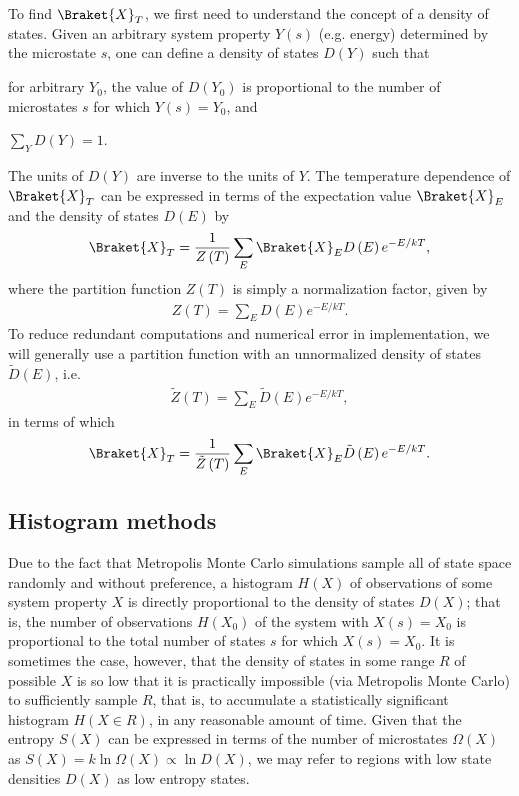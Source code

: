 \documentclass[11pt]{article}
\newcommand{\bk}{\Braket} %
\newcommand{\f}[2]{\dfrac{#1}{#2}} %
\newcommand{\p}[1]{\left(#1\right)} %
\begin{document}
To find $\bk{X}_T$, we first need to understand the concept of a
density of states. Given an arbitrary system property $Y\p{s}$
(e.g. energy) determined by the microstate $s$, one can define a
density of states $D\p{Y}$ such that
\begin{enumerate*}[label=\roman*)]
\item for arbitrary $Y_0$, the value of $D\p{Y_0}$ is proportional to
  the number of microstates $s$ for which $Y\p{s}=Y_0$, and
\item $\sum_YD\p{Y}=1$.
\end{enumerate*}
The units of $D\p{Y}$ are inverse to the units of $Y$. The temperature
dependence of $\bk{X}_T$ can be expressed in terms of the expectation
value $\bk{X}_E$ and the density of states $D\p{E}$ by
\begin{align}
  \bk{X}_T=\f1{Z\p{T}}\sum_E\bk{X}_ED\p{E}e^{-E/kT},
  \label{eq:XT_norm}
\end{align}
where the partition function $Z\p{T}$ is simply a normalization
factor, given by
\begin{align}
  Z\p{T}=\sum_ED\p{E}e^{-E/kT}.
  \label{eq:Z_norm}
\end{align}
To reduce redundant computations and numerical error in
implementation, we will generally use a partition function with an
unnormalized density of states $\tilde D\p{E}$, i.e.
\begin{align}
  \tilde Z\p{T}=\sum_E\tilde D\p{E}e^{-E/kT},
  \label{eq:Z}
\end{align}
in terms of which
\begin{align}
  \bk{X}_T=\f1{\tilde Z\p{T}}\sum_E\bk{X}_E\tilde D\p{E}e^{-E/kT}.
  \label{eq:XT}
\end{align}

\subsection{Histogram methods}
\label{sec:histogram_methods}

Due to the fact that Metropolis Monte Carlo simulations sample all of
state space randomly and without preference, a histogram $H\p{X}$ of
observations of some system property $X$ is directly proportional to
the density of states $D\p{X}$; that is, the number of observations
$H\p{X_0}$ of the system with $X\p{s}=X_0$ is proportional to the
total number of states $s$ for which $X\p{s}=X_0$. It is sometimes the
case, however, that the density of states in some range $R$ of
possible $X$ is so low that it is practically impossible (via
Metropolis Monte Carlo) to sufficiently sample $R$, that is, to
accumulate a statistically significant histogram $H\p{X\in R}$, in any
reasonable amount of time. Given that the entropy $S\p{X}$ can be
expressed in terms of the number of microstates $\Omega\p{X}$ as
$S\p{X}=k\ln\Omega\p{X}\propto\ln D\p{X}$, we may refer to regions
with low state densities $D\p{X}$ as low entropy states.
\end{document}
